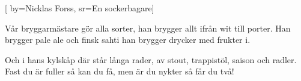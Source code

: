 [ 							
	by={Nicklas Forss},
	sr={En sockerbagare}]		
	
\beginverse*						
Vår bryggarmästare gör alla sorter,
han brygger allt ifrån wit till porter.
Han brygger pale ale och finsk sahti
han brygger drycker med frukter i.
\endverse						

\beginverse				
Och i hans kylskåp där står långa rader,
av stout, trappistöl, saison och radler.
Fast du är fuller så kan du få,
men är du nykter så får du två!
\endverse				
\endsong	
